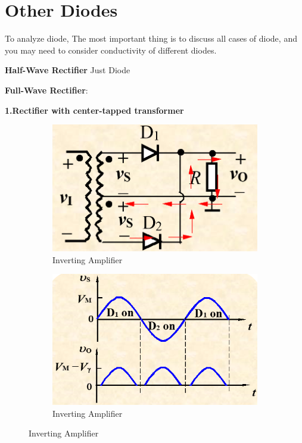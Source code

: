 \documentclass[a4paper,11pt,UTF8]{article}
\begin{document}
\section{Other Diodes}
To analyze diode, The most important thing is to discuss all cases of diode, and you may need to consider conductivity of different diodes.

\textbf{Half-Wave Rectifier} Just Diode

\textbf{Full-Wave Rectifier}:

\textbf{\quad1.Rectifier with center-tapped transformer}
\begin{figure}[H]
	\begin{minipage}{.5\textwidth}
		\begin{figure}[H] 
			\centering 
			\includegraphics[scale=0.3]{./img/2.1}
			\caption{Inverting Amplifier}
		\end{figure}
	\end{minipage}
	\begin{minipage}{.5\textwidth}
		\begin{figure}[H] 
			\centering 
			\includegraphics[scale=0.4]{./img/2.2}
			\caption{Inverting Amplifier}
		\end{figure}
	\end{minipage}
\end{figure}
\end{document}
